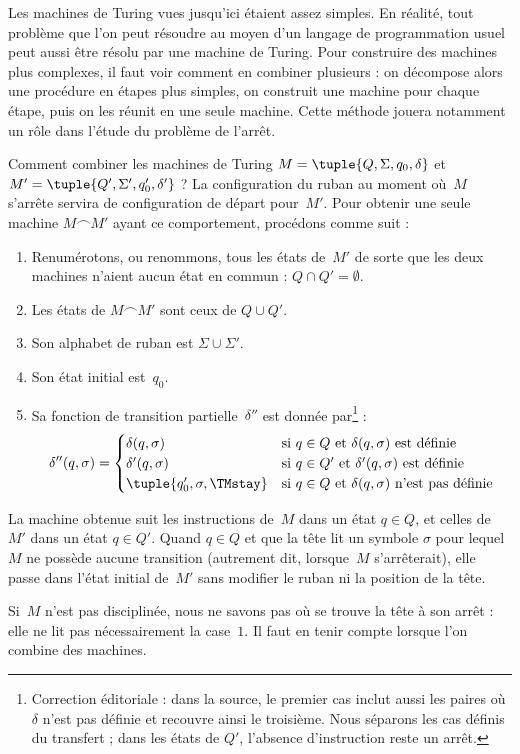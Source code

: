 \documentclass[../../../include/open-logic-section]{subfiles}
\begin{document}

\begin{explain}
Les machines de Turing vues jusqu'ici étaient assez simples.
En réalité, tout problème que l'on peut résoudre au moyen
d'un langage de programmation usuel peut aussi être résolu
par une machine de Turing. Pour construire des machines plus
complexes, il faut voir comment en combiner plusieurs :
on décompose alors une procédure en étapes plus simples,
on construit une machine pour chaque étape, puis on les
réunit en une seule machine. Cette méthode jouera notamment
un rôle dans l'étude du problème de l'arrêt.

Comment combiner les machines de Turing
$M=\tuple{Q,\Sigma,q_0,\delta}$ et
$M'=\tuple{Q',\Sigma',q_0',\delta'}$ ?
La configuration du ruban au moment où~$M$ s'arrête
servira de configuration de départ pour~$M'$.
Pour obtenir une seule machine $M\frown M'$ ayant ce
comportement, procédons comme suit :
\begin{enumerate}
    \item Renumérotons, ou renommons, tous les états de~$M'$
    de sorte que les deux machines n'aient aucun état en
    commun : $Q\cap Q'=\emptyset$.
    \item Les états de $M\frown M'$ sont ceux de $Q\cup Q'$.
    \item Son alphabet de ruban est $\Sigma\cup\Sigma'$.
    \item Son état initial est~$q_0$.
    \item Sa fonction de transition partielle~$\delta''$
    est donnée par\footnote{Correction éditoriale : dans la source, le premier cas inclut aussi les paires où $\delta$ n'est pas définie et recouvre ainsi le troisième. Nous séparons les cas définis du transfert ; dans les états de $Q'$, l'absence d'instruction reste un arrêt.} :
    \[\delta''(q,\sigma) =
    \begin{cases}
      \delta(q,\sigma) & \text{si $q\in Q$ et
      $\delta(q,\sigma)$ est définie}\\
      \delta'(q,\sigma) & \text{si $q\in Q'$ et
      $\delta'(q,\sigma)$ est définie}\\
      \tuple{q_0',\sigma,\TMstay} & \text{si $q\in Q$ et
      $\delta(q,\sigma)$ n'est pas définie}
    \end{cases}\]
\end{enumerate}
La machine obtenue suit les instructions de~$M$ dans
un état $q\in Q$, et celles de~$M'$ dans un état
$q\in Q'$. Quand $q\in Q$ et que la tête lit un symbole
$\sigma$ pour lequel~$M$ ne possède aucune transition
(autrement dit, lorsque~$M$ s'arrêterait), elle passe
dans l'état initial de~$M'$ sans modifier le ruban ni
la position de la tête.

Si~$M$ n'est pas disciplinée, nous ne savons pas où se
trouve la tête à son arrêt : elle ne lit pas
nécessairement la case~$1$. Il faut en tenir compte
lorsque l'on combine des machines.
\end{explain}
\end{document}
